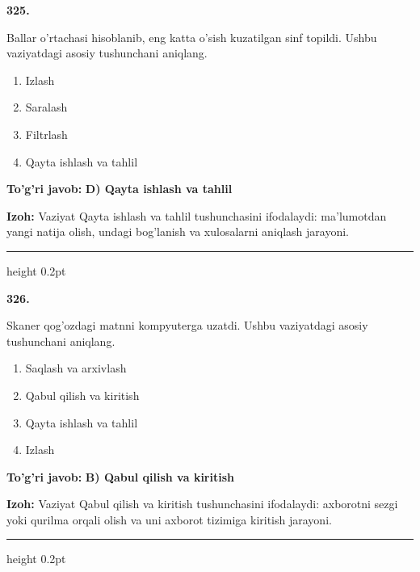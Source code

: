 \documentclass[10pt,a4paper,oneside]{article}
\begin{document}
\noindent\textbf{\color{ink}325.}
\par
Ballar o'rtachasi hisoblanib, eng katta o'sish kuzatilgan sinf topildi. Ushbu vaziyatdagi asosiy tushunchani aniqlang.
\begin{enumerate}[label=\Alph*),leftmargin=9mm]
\item Izlash
\item Saralash
\item Filtrlash
\item Qayta ishlash va tahlil
\end{enumerate}
\begin{tcolorbox}[enhanced,breakable,colback=teal!4,colframe=teal!50!black,boxrule=0.5pt,arc=1.1mm,left=3mm,right=3mm,top=1.7mm,bottom=1.7mm,before skip=2mm,after skip=2mm]
\textbf{\color{teal}To'g'ri javob:} \textbf{D) Qayta ishlash va tahlil}
\par\smallskip
\textbf{Izoh:} Vaziyat Qayta ishlash va tahlil tushunchasini ifodalaydi: ma'lumotdan yangi natija olish, undagi bog'lanish va xulosalarni aniqlash jarayoni.
\end{tcolorbox}
\vspace{2mm}\hrule height 0.2pt \vspace{3mm}

\noindent\textbf{\color{ink}326.}
\par
Skaner qog'ozdagi matnni kompyuterga uzatdi. Ushbu vaziyatdagi asosiy tushunchani aniqlang.
\begin{enumerate}[label=\Alph*),leftmargin=9mm]
\item Saqlash va arxivlash
\item Qabul qilish va kiritish
\item Qayta ishlash va tahlil
\item Izlash
\end{enumerate}
\begin{tcolorbox}[enhanced,breakable,colback=teal!4,colframe=teal!50!black,boxrule=0.5pt,arc=1.1mm,left=3mm,right=3mm,top=1.7mm,bottom=1.7mm,before skip=2mm,after skip=2mm]
\textbf{\color{teal}To'g'ri javob:} \textbf{B) Qabul qilish va kiritish}
\par\smallskip
\textbf{Izoh:} Vaziyat Qabul qilish va kiritish tushunchasini ifodalaydi: axborotni sezgi yoki qurilma orqali olish va uni axborot tizimiga kiritish jarayoni.
\end{tcolorbox}
\vspace{2mm}\hrule height 0.2pt \vspace{3mm}
\end{document}
